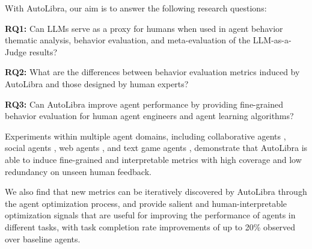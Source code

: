 With AutoLibra, our aim is to answer the following research questions:

\textbf{RQ1:} Can LLMs serve as a proxy  for humans when used in agent behavior thematic analysis,
    behavior evaluation, and meta-evaluation of the LLM-as-a-Judge results?

\textbf{RQ2:}    What are the differences between behavior evaluation metrics  induced by AutoLibra and those designed by human experts?

\textbf{RQ3:}  Can AutoLibra improve agent performance by providing fine-grained behavior evaluation for human agent engineers and agent learning algorithms?


Experiments within multiple agent domains, including collaborative agents \citep{shao2024collaborative}, social agents
\citep{zhousotopia}, web agents \citep{zhouwebarena,he2024webvoyager}, and text game agents \citep{paglieri2024balrog,cloos2024babaaibreakrules}, 
demonstrate that AutoLibra is able to induce fine-grained and interpretable metrics with high coverage and low redundancy on unseen human feedback.

We also find that new metrics can be iteratively discovered by AutoLibra through the agent optimization process,
and provide salient and human-interpretable optimization signals that are useful for improving the performance of agents in different tasks, with task completion rate improvements of up to 20\% observed over baseline agents.



